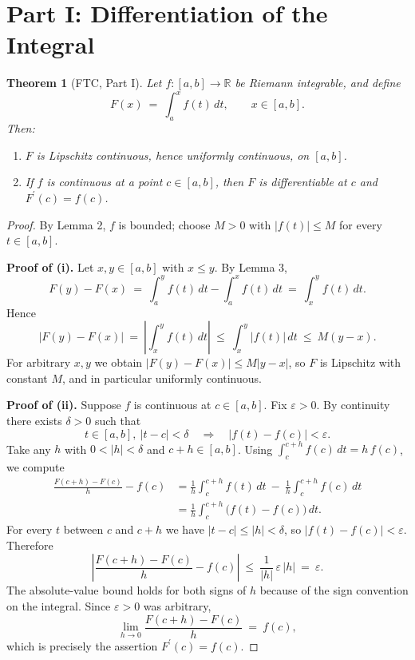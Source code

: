 \documentclass{article}
\newtheorem{theorem}{Theorem}[section]
\theoremstyle{definition}
\begin{document}
\section{Part I: Differentiation of the Integral}

\begin{theorem}[FTC, Part I]
Let $f\colon[a,b]\to\mathbb{R}$ be Riemann integrable, and define
$$F(x)\ =\ \int_{a}^{x}f(t)\,dt,\qquad x\in[a,b].$$
Then:
\begin{enumerate}
    \item $F$ is Lipschitz continuous, hence uniformly continuous, on $[a,b]$.
    \item If $f$ is continuous at a point $c\in[a,b]$, then $F$ is differentiable at $c$ and $F^{\prime}(c)=f(c)$.
\end{enumerate}
\end{theorem}

\begin{proof}
By Lemma 2, $f$ is bounded; choose $M>0$ with $|f(t)|\leq M$ for every $t\in[a,b]$.

\textbf{Proof of (i).} Let $x,y\in[a,b]$ with $x\leq y$. By Lemma 3,
$$F(y)-F(x)\ =\ \int_{a}^{y}f(t)\,dt-\int_{a}^{x}f(t)\,dt\ =\ \int_{x}^{y}f(t)\,dt.$$
Hence
$$|F(y)-F(x)|\ =\ \left|\int_{x}^{y}f(t)\,dt\right|\ \leq\ \int_{x}^{y}|f(t)|\,dt\ \leq\ M\left(y-x\right).$$
For arbitrary $x,y$ we obtain $|F(y)-F(x)|\leq M\left|y-x\right|$, so $F$ is Lipschitz with constant $M$, and in particular uniformly continuous.

\textbf{Proof of (ii).} Suppose $f$ is continuous at $c\in[a,b]$. Fix $\varepsilon>0$. By continuity there exists $\delta>0$ such that
$$t\in[a,b],\ |t-c|<\delta\quad\Longrightarrow\quad|f(t)-f(c)|<\varepsilon.$$
Take any $h$ with $0<|h|<\delta$ and $c+h\in[a,b]$. Using $\int_{c}^{c+h}f(c)\,dt=h\,f(c)$, we compute
\begin{align*}
\frac{F(c+h)-F(c)}{h}-f(c) &=\frac{1}{h}\int_{c}^{c+h}f(t)\,dt\ -\ \frac{1}{h}\int_{c}^{c+h}f(c)\,dt\\
&=\frac{1}{h}\int_{c}^{c+h}\big(f(t)-f(c)\big)\,dt.
\end{align*}
For every $t$ between $c$ and $c+h$ we have $|t-c|\leq|h|<\delta$, so $|f(t)-f(c)|<\varepsilon$. Therefore
$$\left|\frac{F(c+h)-F(c)}{h}-f(c)\right|\ \leq\ \frac{1}{|h|}\,\varepsilon\,|h|\ =\ \varepsilon.$$
The absolute-value bound holds for both signs of $h$ because of the sign convention on the integral. Since $\varepsilon>0$ was arbitrary,
$$\lim_{h\to 0}\frac{F(c+h)-F(c)}{h}\ =\ f(c),$$
which is precisely the assertion $F^{\prime}(c)=f(c)$.
\end{proof}
\end{document}
